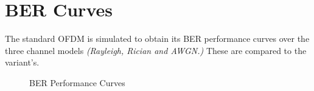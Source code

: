 \section{BER Curves}
The standard \gls{OFDM} is simulated to obtain its \gls{BER} performance curves over the three channel models \emph{(Rayleigh, Rician and AWGN.)} These are compared to the variant's.

\begin{figure}[htpb!]
	\centerline{}
	\caption{BER Performance Curves}
	\label{fig:awgn_fit}
\end{figure}

\pagebreak
